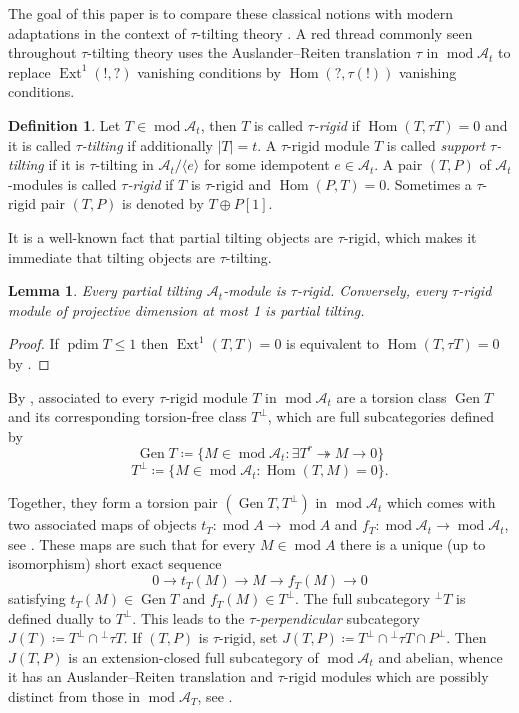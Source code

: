 \documentclass[10pt,twoside, a4paper,reqno]{amsart}
\DeclareMathOperator{\mods}{mod}
\DeclareMathOperator{\Ext}{Ext}
\DeclareMathOperator{\Hom}{Hom}
\DeclareMathOperator{\projdim}{pdim}
\DeclareMathOperator{\Gen}{Gen}
\newcommand{\A}{\mathscr{A}}
\newtheorem{lemma}[theorem]{Lemma}
\theoremstyle{definition}
\newtheorem{definition}[theorem]{Definition}
\begin{document}
The goal of this paper is to compare these classical notions with modern adaptations in the context of $\tau$-tilting theory \cite{AIR2014}. A red thread commonly seen throughout $\tau$-tilting theory uses the Auslander--Reiten translation $\tau$ in $\mods \A_t$ to replace $\Ext^1(!,?)$ vanishing conditions by $\Hom(?, \tau(!))$ vanishing conditions.

\begin{definition}\cite{AIR2014}
    Let $T \in \mods \A_t$, then $T$ is called \textit{$\tau$-rigid} if $\Hom(T, \tau T) = 0$ and it is called \textit{$\tau$-tilting} if additionally $|T|=t$. A $\tau$-rigid module $T$ is called \textit{support $\tau$-tilting} if it is $\tau$-tilting in $\A_t/\langle e \rangle$ for some idempotent $e \in \A_t$. A pair $(T,P)$ of $\A_t$-modules is called \textit{$\tau$-rigid} if $T$ is $\tau$-rigid and $\Hom(P,T) =0$. Sometimes a $\tau$-rigid pair $(T,P)$ is denoted by $T \oplus P[1]$. 
\end{definition}

It is a well-known fact that partial tilting objects are $\tau$-rigid, which makes it immediate that tilting objects are $\tau$-tilting.

\begin{lemma}\label{lem:tiltistau}
    Every partial tilting $\A_t$-module is $\tau$-rigid. Conversely, every $\tau$-rigid module of projective dimension at most 1 is partial tilting.
\end{lemma}
\begin{proof}
    If $\projdim T \leq 1$ then $\Ext^1(T,T)=0$ is equivalent to $\Hom(T, \tau T)=0$ by \cite[Cor. IV.4.7]{ARS1995}.
\end{proof}


By \cite[Thm. 0.5]{AIR2014}, associated to every $\tau$-rigid module $T$ in $\mods \A_t$ are a torsion class $\Gen T$ and its corresponding torsion-free class $T^\perp$, which are full subcategories defined by
\[ \Gen T \coloneqq \{ M \in \mods \A_t: \exists T^r \twoheadrightarrow M \to 0 \} \]
\[ T^\perp \coloneqq \{ M \in \mods \A_t: \Hom(T,M) = 0\}. \]  

Together, they form a torsion pair $(\Gen T, T^\perp)$ in $\mods \A_t$ which comes with two associated maps of objects $t_T: \mods A \to \mods A$ and $f_T: \mods \A_t \to \mods \A_t$, see \cite{Dickson66}. These maps are such that for every $M \in \mods A$ there is a unique (up to isomorphism) short exact sequence
\[ 0 \to t_T (M) \to M \to f_T (M) \to 0\]
satisfying $t_T (M) \in \Gen T$ and $f_T (M) \in T^\perp$. The full subcategory $^\perp T$ is defined dually to $T^\perp$. This leads to the \textit{$\tau$-perpendicular} subcategory $J(T) \coloneqq T^\perp \cap {}^\perp \tau T$. If $(T,P)$ is $\tau$-rigid, set $J(T,P) \coloneqq T^\perp \cap {}^\perp \tau T \cap P^\perp$. Then $J(T,P)$ is an extension-closed full subcategory of $\mods \A_t$ and abelian, whence it has an Auslander--Reiten translation and $\tau$-rigid modules which are possibly distinct from those in $\mods \A_T$, see \cite{Jasso2015}. 
\end{document}
